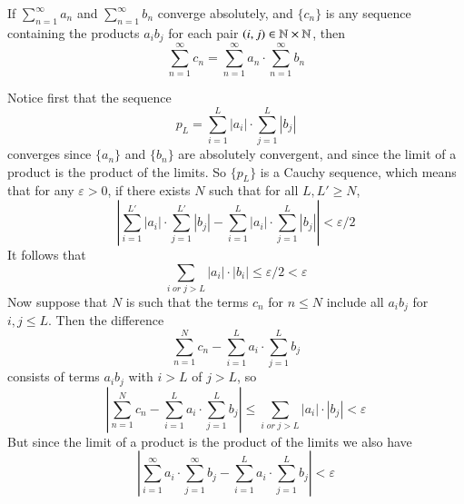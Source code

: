 \documentclass[12pt]{report}
\begin{document}
\begin{thm}{}{}
    If $\sum\limits_{n=1}^{\infty}a_n$ and $\sum\limits_{n=1}^{\infty}b_n$ converge absolutely, and $\{c_n\}$ is any sequence containing the products $a_ib_j$ for each pair $(i,j) \in \mathbb N\times \mathbb N$, then \begin{equation*}
        \sum\limits_{n=1}^{\infty}c_n = \sum\limits_{n=1}^{\infty}a_n\cdot\sum\limits_{n=1}^{\infty}b_n
    \end{equation*}
\end{thm}
\begin{proof*}{}{}
    Notice first that the sequence \begin{equation*}
        p_L = \sum\limits_{i=1}^L|a_i|\cdot \sum\limits_{j=1}^L|b_j|
    \end{equation*}
    converges since $\{a_n\}$ and $\{b_n\}$ are absolutely convergent, and since the limit of a product is the product of the limits. So $\{p_L\}$ is a Cauchy sequence, which means that for any $\varepsilon > 0$, if there exists $N$ such that for all $L,L' \geq N$, \begin{equation*}
        \left|\sum\limits_{i=1}^{L'}|a_i|\cdot \sum\limits_{j=1}^{L'}|b_j| - \sum\limits_{i=1}^L|a_i|\cdot \sum\limits_{j=1}^L|b_j|\right| < \varepsilon/2
    \end{equation*}
    It follows that \begin{equation*}
        \sum\limits_{i\;or\;j > L} |a_i|\cdot|b_i| \leq \varepsilon/2 < \varepsilon \tag{1}
    \end{equation*}
    Now suppose that $N$ is such that the terms $c_n$ for $n \leq N$ include all $a_ib_j$ for $i,j \leq L$. Then the difference \begin{equation*}
        \sum\limits_{n=1}^Nc_n - \sum\limits_{i=1}^La_i\cdot \sum\limits_{j=1}^Lb_j
    \end{equation*}
    consists of terms $a_ib_j$ with $i > L$ of $j > L$, so \begin{equation*}
        \left|\sum\limits_{n=1}^Nc_n - \sum\limits_{i=1}^La_i\cdot \sum\limits_{j=1}^Lb_j\right| \leq \sum\limits_{i\;or\;j>L}|a_i|\cdot|b_j| < \varepsilon \tag{2}
    \end{equation*}
    But since the limit of a product is the product of the limits we also have \begin{equation*}
        \left|\sum\limits_{i=1}^{\infty}a_i\cdot \sum\limits_{j=1}^{\infty}b_j - \sum\limits_{i=1}^La_i\cdot \sum\limits_{j=1}^Lb_j\right| < \varepsilon \tag{3}
    \end{equation*}

\end{proof*}
\end{document}
